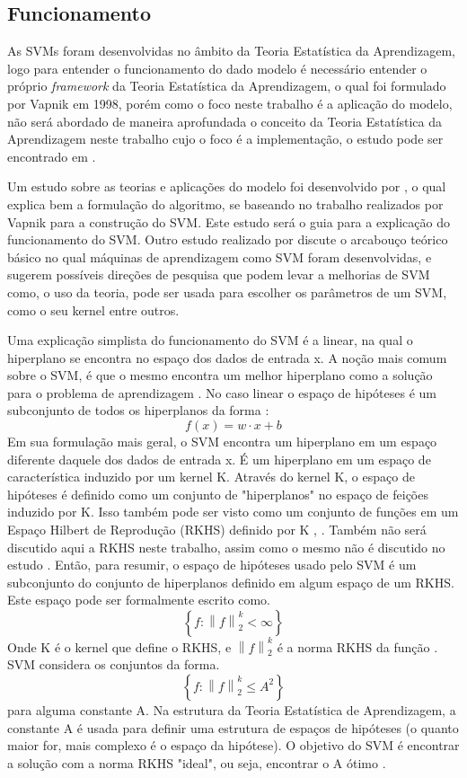  \subsection{Funcionamento}

As SVMs foram desenvolvidas no âmbito da Teoria Estatística da Aprendizagem, logo para entender o funcionamento do dado modelo é necessário entender o próprio \textit{framework} da Teoria Estatística da Aprendizagem, o qual foi formulado por Vapnik em 1998, porém como o foco neste trabalho é a aplicação do modelo, não será abordado de maneira aprofundada o conceito da Teoria Estatística da Aprendizagem neste trabalho cujo o foco é a implementação, o estudo pode ser encontrado em \cite{vapnik1998statistical}.

Um estudo sobre as teorias e aplicações do modelo foi desenvolvido por \cite{evgeniou1999support}, o qual explica bem a formulação do algoritmo, se baseando no trabalho realizados por Vapnik para a construção do SVM. Este estudo será o guia para a explicação do funcionamento do SVM. Outro estudo realizado por \cite{vayatis99estimate} discute o arcabouço teórico básico no qual máquinas de aprendizagem como SVM foram desenvolvidas, e sugerem possíveis direções de pesquisa que podem levar a melhorias de SVM como, o uso da teoria, pode ser usada para escolher os parâmetros de um SVM, como o seu kernel entre outros.
 
Uma explicação simplista do funcionamento do SVM é a linear, na qual o hiperplano se encontra no espaço dos dados de entrada x. A noção mais comum sobre o SVM, é que o mesmo encontra um melhor hiperplano como a solução para o problema de aprendizagem \cite{vapnik1998statistical}. No caso linear o espaço de hipóteses é um subconjunto de todos os hiperplanos da forma \cite{evgeniou1999support}:\[f(x)= w\cdot x +b\]
Em sua formulação mais geral, o SVM encontra um hiperplano em um espaço diferente daquele dos dados de entrada x. É um hiperplano em um espaço de característica induzido por um kernel K. Através do kernel K, o espaço de hipóteses é definido como um conjunto de "hiperplanos" no espaço de feições induzido por K. Isso também pode ser visto como um conjunto de funções em um Espaço Hilbert de Reprodução (RKHS) definido por K \cite{wahba1990spline}, \cite{vapnik1998statistical}. Também não será discutido aqui a RKHS neste trabalho, assim como o mesmo não é discutido no estudo \cite{evgeniou1999support}. Então, para resumir, o espaço de hipóteses usado pelo SVM é um subconjunto do conjunto de hiperplanos definido em algum espaço de um RKHS. Este espaço pode ser formalmente escrito como.\[\left \{ f:\left \| f \right \|_{2}^{k} < \infty \right \}\]
Onde K é o kernel que define o RKHS, e $ \left \| f \right \|_{2}^{k} $  é a norma RKHS da função \cite{wahba1990spline}. SVM considera os conjuntos da forma. \[\left \{ f:\left \| f \right \|_{2}^{k} \leq A^{2} \right \}\] para alguma constante A. Na estrutura da Teoria Estatística de Aprendizagem, a constante A é usada para definir uma estrutura de espaços de hipóteses (o quanto maior for, mais complexo é o espaço da hipótese). O objetivo do SVM é encontrar a solução com a norma RKHS "ideal", ou seja, encontrar o A ótimo \cite{evgeniou1999support}.

